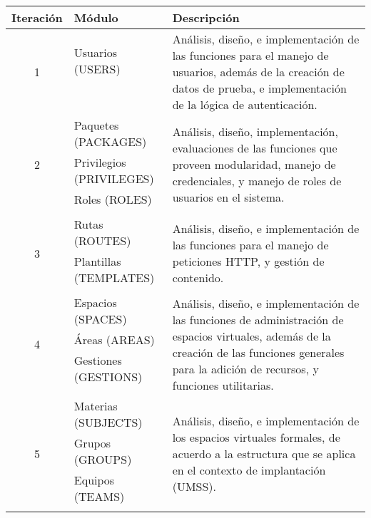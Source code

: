 \begin{table}
\centering
\begin{tabular}{|c|l|p{8.0cm}|}
\hline
Iteración & Módulo & Descripción \\
\hline

\multirow{4}{*}{1} &
Usuarios (USERS) &
\multirow{4}{8cm}{Análisis, diseño, e implementación de las funciones para el
manejo de usuarios, además de la creación de datos de prueba, e implementación
de la lógica de autenticación.} \\
 &  & \\
 &  & \\
 &  & \\
\hline

\multirow{4}{*}{2} &
Paquetes (PACKAGES) &
\multirow{4}{8cm}{Análisis, diseño, implementación, evaluaciones de las
funciones que proveen modularidad, manejo de credenciales, y manejo de roles de
usuarios en el sistema.} \\
 & Privilegios (PRIVILEGES) & \\
 & Roles (ROLES) & \\
 &  & \\
\hline

\multirow{3}{*}{3} &
Rutas (ROUTES) &
\multirow{3}{8cm}{Análisis, diseño, e implementación de las funciones para el
manejo de peticiones HTTP, y gestión de contenido.} \\
 & Plantillas (TEMPLATES) & \\
 & & \\
\hline

\multirow{5}{*}{4} &
Espacios (SPACES) &
\multirow{5}{8cm}{Análisis, diseño, e implementación de las funciones de
administración de espacios virtuales, además de la creación de las funciones
generales para la adición de recursos, y funciones utilitarias.} \\
 & Áreas (AREAS) & \\
 & Gestiones (GESTIONS) & \\
 & & \\
 & & \\
\hline

\multirow{4}{*}{5} &
Materias (SUBJECTS) &
\multirow{4}{8cm}{Análisis, diseño, e implementación de los espacios virtuales
formales, de acuerdo a la estructura que se aplica en el contexto de
implantación (UMSS).} \\
 & Grupos (GROUPS) & \\
 & Equipos (TEAMS) & \\
 & & \\
\hline


\end{tabular}
\end{table}
